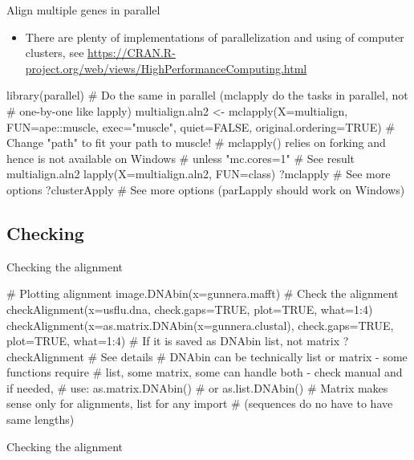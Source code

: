 \documentclass[compress, xelatex, 11pt, xcolor=svgnames, aspectratio=169,
	hyperref={
		bookmarks=true,
		unicode=true,
		colorlinks=true,
		pdftitle={Molecular data in R},
		plainpages=false,
		pdfauthor={Vojtech Zeisek},
		pdfsubject={Course about phylogeny and evolution in R},
		pdfcreator={XeLaTeX},
		pdfkeywords={R, evolution, phylogeny, molecular data},
		linkcolor=Crimson, %
		anchorcolor=Magenta, %
		citecolor=Magenta, %
		filecolor=Magenta, %
		menucolor=Magenta, %
		urlcolor=DodgerBlue, %
		},
	url={hyphens, lowtilde} %
	]{beamer}
\renewcommand{\texttt}[1]{\colorbox{Beige}{{\ttfamily #1}}}
\begin{document}
\begin{frame}[fragile]{Align multiple genes in parallel}
	\begin{itemize}
		\item There are plenty of implementations of parallelization and using of computer clusters, see \url{https://CRAN.R-project.org/web/views/HighPerformanceComputing.html}
	\end{itemize}
	\begin{spluscode}
    library(parallel)
    # Do the same in parallel (mclapply do the tasks in parallel, not
    # one-by-one like lapply)
    multialign.aln2 <- mclapply(X=multialign, FUN=ape::muscle,
      exec="muscle", quiet=FALSE, original.ordering=TRUE)
    # Change "path" to fit your path to muscle!
    # mclapply() relies on forking and hence is not available on Windows
    # unless "mc.cores=1"
    # See result
    multialign.aln2
    lapply(X=multialign.aln2, FUN=class)
    ?mclapply # See more options
    ?clusterApply # See more options (parLapply should work on Windows)
	\end{spluscode}
\end{frame}

\subsection{Checking}

\begin{frame}[fragile]{Checking the alignment}
	\begin{spluscode}
    # Plotting alignment
    image.DNAbin(x=gunnera.mafft)
    # Check the alignment
    checkAlignment(x=usflu.dna, check.gaps=TRUE, plot=TRUE, what=1:4)
    checkAlignment(x=as.matrix.DNAbin(x=gunnera.clustal), check.gaps=TRUE,
      plot=TRUE, what=1:4) # If it is saved as DNAbin list, not matrix
    ?checkAlignment # See details
    # DNAbin can be technically list or matrix - some functions require
    # list, some matrix, some can handle both - check manual and if needed,
    # use:
    as.matrix.DNAbin() # or
    as.list.DNAbin()
    # Matrix makes sense only for alignments, list for any import
    # (sequences do no have to have same lengths)
	\end{spluscode}
\end{frame}

\begin{frame}{Checking the alignment}
	\begin{center}
		\texttt{[image: checkalignment.png]}
	\end{center}
\end{frame}
\end{document}
